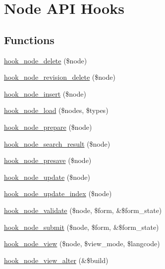 \hypertarget{group__node__api__hooks}{
\section{Node API Hooks}
\label{group__node__api__hooks}
}
\subsection*{Functions}
\begin{DoxyCompactItemize}
\item 
\hyperlink{group__node__api__hooks_ga66ea0473a9950dc961802e801e5042e9}{hook\_\-node\_\-delete} (\$node)
\item 
\hyperlink{group__node__api__hooks_gad7e8c6941181366016058771ae841bc9}{hook\_\-node\_\-revision\_\-delete} (\$node)
\item 
\hyperlink{group__node__api__hooks_ga8b40dc62e46e5055c205d2a723dc3548}{hook\_\-node\_\-insert} (\$node)
\item 
\hyperlink{group__node__api__hooks_gad48bb14b68ed38526029d1f7ac2d2de4}{hook\_\-node\_\-load} (\$nodes, \$types)
\item 
\hyperlink{group__node__api__hooks_ga4bbe7320bd52fc6183920c8be2d9d4f6}{hook\_\-node\_\-prepare} (\$node)
\item 
\hyperlink{group__node__api__hooks_ga8644320a0e04e3a503c99626d4223725}{hook\_\-node\_\-search\_\-result} (\$node)
\item 
\hyperlink{group__node__api__hooks_gab339b1a1ce0e235d4a9c5a05e410dcd6}{hook\_\-node\_\-presave} (\$node)
\item 
\hyperlink{group__node__api__hooks_gac66c767cc922fcbfdaf17252e5d87d9d}{hook\_\-node\_\-update} (\$node)
\item 
\hyperlink{group__node__api__hooks_gac8420f204c69a4dc641f4d809a870b05}{hook\_\-node\_\-update\_\-index} (\$node)
\item 
\hyperlink{group__node__api__hooks_gad26227eaf0dd513134767a11be40ab1d}{hook\_\-node\_\-validate} (\$node, \$form, \&\$form\_\-state)
\item 
\hyperlink{group__node__api__hooks_ga1b479b731ecb3f9eec0c92e3e1a8e01d}{hook\_\-node\_\-submit} (\$node, \$form, \&\$form\_\-state)
\item 
\hyperlink{group__node__api__hooks_ga475290ee8e81a2373ea17c512cc3f9a9}{hook\_\-node\_\-view} (\$node, \$view\_\-mode, \$langcode)
\item 
\hyperlink{group__node__api__hooks_gad5ece824736be57bf0020af900398b94}{hook\_\-node\_\-view\_\-alter} (\&\$build)

\end{DoxyCompactItemize}

